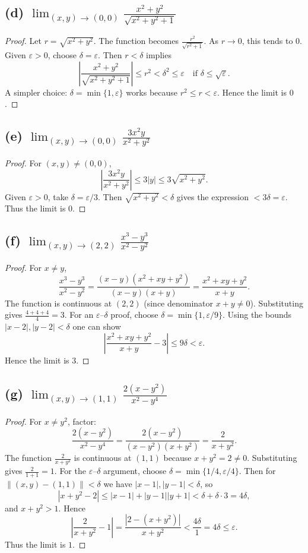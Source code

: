 \documentclass{article}
\begin{document}
\subsection*{(d) $\displaystyle \lim_{(x,y)\to(0,0)}\frac{x^2+y^2}{\sqrt{x^2+y^2+1}}$}
\begin{proof}
	Let $r=\sqrt{x^2+y^2}$. The function becomes $\frac{r^2}{\sqrt{r^2+1}}$. As $r\to0$, this tends to $0$.
	Given $\varepsilon>0$, choose $\delta=\varepsilon$. Then $r<\delta$ implies
	\[
		\left|\frac{x^2+y^2}{\sqrt{x^2+y^2+1}}\right|\le r^2 < \delta^2 \le \varepsilon\quad\text{if }\delta\le\sqrt{\varepsilon}.
	\]
	A simpler choice: $\delta=\min\{1,\varepsilon\}$ works because $r^2\le r<\varepsilon$. Hence the limit is $0$.
\end{proof}

\subsection*{(e) $\displaystyle \lim_{(x,y)\to(0,0)}\frac{3x^2y}{x^2+y^2}$}
\begin{proof}
	For $(x,y)\neq(0,0)$,
	\[
		\left|\frac{3x^2y}{x^2+y^2}\right|\le 3|y|\le 3\sqrt{x^2+y^2}.
	\]
	Given $\varepsilon>0$, take $\delta=\varepsilon/3$. Then $\sqrt{x^2+y^2}<\delta$ gives the expression $<3\delta=\varepsilon$. Thus the limit is $0$.
\end{proof}

\subsection*{(f) $\displaystyle \lim_{(x,y)\to(2,2)}\frac{x^3-y^3}{x^2-y^2}$}
\begin{proof}
	For $x\neq y$,
	\[
		\frac{x^3-y^3}{x^2-y^2}= \frac{(x-y)(x^2+xy+y^2)}{(x-y)(x+y)} = \frac{x^2+xy+y^2}{x+y}.
	\]
	The function is continuous at $(2,2)$ (since denominator $x+y\neq0$). Substituting gives $\frac{4+4+4}{4}=3$.
	For an $\varepsilon$–$\delta$ proof, choose $\delta=\min\{1,\varepsilon/9\}$. Using the bounds $|x-2|,|y-2|<\delta$ one can show
	\[
		\left|\frac{x^2+xy+y^2}{x+y}-3\right| \le 9\delta <\varepsilon.
	\]
	Hence the limit is $3$.
\end{proof}

\subsection*{(g) $\displaystyle \lim_{(x,y)\to(1,1)}\frac{2(x-y^2)}{x^2-y^4}$}
\begin{proof}
	For $x\neq y^2$, factor:
	\[
		\frac{2(x-y^2)}{x^2-y^4}= \frac{2(x-y^2)}{(x-y^2)(x+y^2)} = \frac{2}{x+y^2}.
	\]
	The function $\frac{2}{x+y^2}$ is continuous at $(1,1)$ because $x+y^2=2\neq0$. Substituting gives $\frac{2}{1+1}=1$.
	For the $\varepsilon$–$\delta$ argument, choose $\delta=\min\{1/4,\varepsilon/4\}$. Then for $\|(x,y)-(1,1)\|<\delta$ we have $|x-1|,|y-1|<\delta$, so
	\[
		|x+y^2-2|\le |x-1|+|y-1||y+1|<\delta+\delta\cdot3 =4\delta,
	\]
	and $x+y^2>1$. Hence
	\[
		\left|\frac{2}{x+y^2}-1\right| = \frac{|2-(x+y^2)|}{x+y^2} < \frac{4\delta}{1}=4\delta\le\varepsilon.
	\]
	Thus the limit is $1$.
\end{proof}
\end{document}

